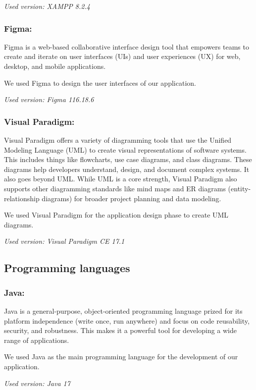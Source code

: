 \documentclass{article}
\begin{document}
\textit{Used version: XAMPP 8.2.4}


\subsubsection*{Figma:}
Figma is a web-based collaborative interface design tool that empowers teams to create and iterate on user interfaces (UIs) and user experiences (UX) for web, desktop, and mobile applications.

We used Figma to design the user interfaces of our application.

\textit{Used version: Figma 116.18.6}

\subsubsection*{Visual Paradigm:}
Visual Paradigm offers a variety of diagramming tools that use the Unified Modeling Language (UML) to create visual representations of software systems. This includes things like flowcharts, use case diagrams, and class diagrams. These diagrams help developers understand, design, and document complex systems.
It also goes beyond UML. While UML is a core strength, Visual Paradigm also supports other diagramming standards like mind maps and ER diagrams (entity-relationship diagrams) for broader project planning and data modeling.

We used Visual Paradigm for the application design phase to create UML diagrams.

\textit{Used version: Visual Paradigm CE 17.1}

\newpage
\subsection[Programming languages]{Programming languages}

\subsubsection*{Java:}
Java is a general-purpose, object-oriented programming language prized for its platform independence (write once, run anywhere) and focus on code reusability, security, and robustness. This makes it a powerful tool for developing a wide range of applications.

We used Java as the main programming language for the development of our application.

\textit{Used version: Java 17}
\end{document}
